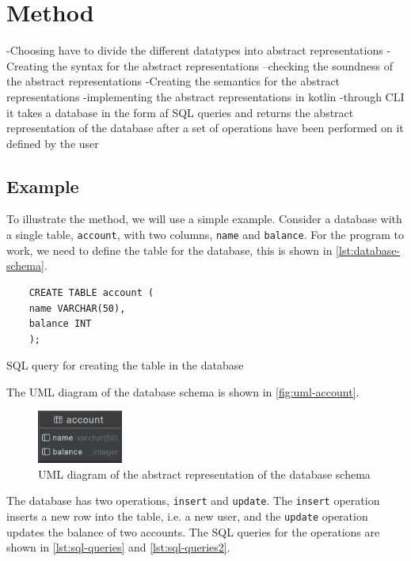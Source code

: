 \section{Method}
\label{sec:method}
-Choosing have to divide the different datatypes into abstract representations
-Creating the syntax for the abstract representations
--checking the soundness of the abstract representations
-Creating the semantics for the abstract representations
-implementing the abstract representations in kotlin
-through CLI it takes a database in the form af SQL queries and returns the abstract representation of the database after a set of operations have been performed on it defined by the user


\subsection{Example}\label{subsec:example}
To illustrate the method, we will use a simple example.
Consider a database with a single table, \texttt{account}, with two columns, \texttt{name} and \texttt{balance}.
For the program to work, we need to define the table for the database, this is shown in \autoref{lst:database-schema}.


\begin{listing}[htb!]
\begin{verbatim}
    CREATE TABLE account (
    name VARCHAR(50),
    balance INT
    );
    \end{verbatim}
\caption{SQL query for creating the table in the database}
\label{lst:database-schema}
\end{listing}


The UML diagram of the database schema is shown in \autoref{fig:uml-account}.

\begin{figure}[htb!]
    \centering
    \includegraphics[width=0.25\textwidth]{figures/account.png}
    \caption{UML diagram of the abstract representation of the database schema}
    \label{fig:uml-account}
\end{figure}

The database has two operations, \texttt{insert} and \texttt{update}.
The \texttt{insert} operation inserts a new row into the table, i.e. a new user, and the \texttt{update} operation updates the balance of two accounts.
The SQL queries for the operations are shown in \autoref{lst:sql-queries} and \autoref{lst:sql-queries2}.

